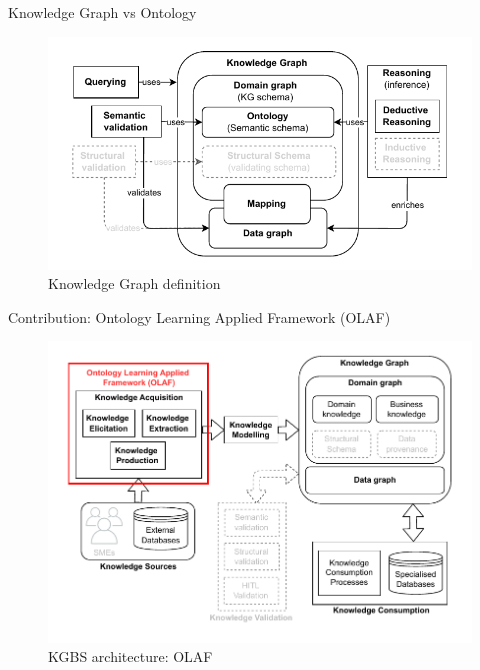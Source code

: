 \begin{frame}{Knowledge Graph vs Ontology}

    \begin{figure} [H]
        \begin{center}
            \includegraphics[scale=0.8]{images/kg-def-simple.pdf} 
            \caption{Knowledge Graph definition} 
        \end{center}
    \end{figure}

\end{frame}

\begin{frame}{Contribution: Ontology Learning Applied Framework (OLAF)}

    \begin{figure} [H]
        \begin{center}
            \includegraphics[scale=0.5]{images/KGBS-knowledge-acquisition-OLAF.pdf} 
            \caption{KGBS architecture: OLAF} 
        \end{center}
    \end{figure}

\end{frame}

